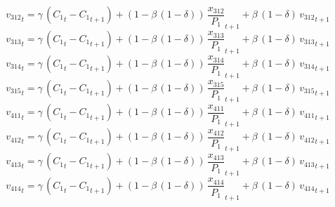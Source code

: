 \begin{dmath}
{{v_{312}}}_{t}={{\gamma}}\, \left({{C_{1}}}_{t}-{{C_{1}}}_{t+1}\right)+\left(1-{{\beta}}\, \left(1-{{\delta}}\right)\right)\, {{\frac{x_{312}}{P_{1}}}}_{t+1}+{{\beta}}\, \left(1-{{\delta}}\right)\, {{v_{312}}}_{t+1}
\end{dmath}
\begin{dmath}
{{v_{313}}}_{t}={{\gamma}}\, \left({{C_{1}}}_{t}-{{C_{1}}}_{t+1}\right)+\left(1-{{\beta}}\, \left(1-{{\delta}}\right)\right)\, {{\frac{x_{313}}{P_{1}}}}_{t+1}+{{\beta}}\, \left(1-{{\delta}}\right)\, {{v_{313}}}_{t+1}
\end{dmath}
\begin{dmath}
{{v_{314}}}_{t}={{\gamma}}\, \left({{C_{1}}}_{t}-{{C_{1}}}_{t+1}\right)+\left(1-{{\beta}}\, \left(1-{{\delta}}\right)\right)\, {{\frac{x_{314}}{P_{1}}}}_{t+1}+{{\beta}}\, \left(1-{{\delta}}\right)\, {{v_{314}}}_{t+1}
\end{dmath}
\begin{dmath}
{{v_{315}}}_{t}={{\gamma}}\, \left({{C_{1}}}_{t}-{{C_{1}}}_{t+1}\right)+\left(1-{{\beta}}\, \left(1-{{\delta}}\right)\right)\, {{\frac{x_{315}}{P_{1}}}}_{t+1}+{{\beta}}\, \left(1-{{\delta}}\right)\, {{v_{315}}}_{t+1}
\end{dmath}
\begin{dmath}
{{v_{411}}}_{t}={{\gamma}}\, \left({{C_{1}}}_{t}-{{C_{1}}}_{t+1}\right)+\left(1-{{\beta}}\, \left(1-{{\delta}}\right)\right)\, {{\frac{x_{411}}{P_{1}}}}_{t+1}+{{\beta}}\, \left(1-{{\delta}}\right)\, {{v_{411}}}_{t+1}
\end{dmath}
\begin{dmath}
{{v_{412}}}_{t}={{\gamma}}\, \left({{C_{1}}}_{t}-{{C_{1}}}_{t+1}\right)+\left(1-{{\beta}}\, \left(1-{{\delta}}\right)\right)\, {{\frac{x_{412}}{P_{1}}}}_{t+1}+{{\beta}}\, \left(1-{{\delta}}\right)\, {{v_{412}}}_{t+1}
\end{dmath}
\begin{dmath}
{{v_{413}}}_{t}={{\gamma}}\, \left({{C_{1}}}_{t}-{{C_{1}}}_{t+1}\right)+\left(1-{{\beta}}\, \left(1-{{\delta}}\right)\right)\, {{\frac{x_{413}}{P_{1}}}}_{t+1}+{{\beta}}\, \left(1-{{\delta}}\right)\, {{v_{413}}}_{t+1}
\end{dmath}
\begin{dmath}
{{v_{414}}}_{t}={{\gamma}}\, \left({{C_{1}}}_{t}-{{C_{1}}}_{t+1}\right)+\left(1-{{\beta}}\, \left(1-{{\delta}}\right)\right)\, {{\frac{x_{414}}{P_{1}}}}_{t+1}+{{\beta}}\, \left(1-{{\delta}}\right)\, {{v_{414}}}_{t+1}
\end{dmath}

